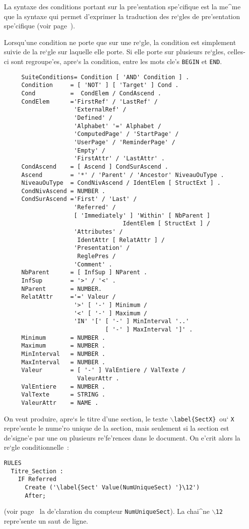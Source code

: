 {La syntaxe des conditions portant sur la pre'sentation spe'cifique est la
me^me que la syntaxe qui permet d'exprimer la traduction des re`gles de
pre'sentation spe'cifique (voir page~\pageref{prestrans}).

Lorsqu'une condition ne porte que sur une re`gle, la condition est simplement
suivie de la re`gle sur laquelle elle porte. Si elle porte sur plusieurs
re`gles, celles-ci sont regroupe'es, apre`s la condition, entre les
mots cle's {\tt BEGIN} et {\tt END}.

\begin{verbatim}
     SuiteConditions= Condition [ 'AND' Condition ] .
     Condition     = [ 'NOT' ] [ 'Target' ] Cond .
     Cond          =  CondElem / CondAscend .
     CondElem      ='FirstRef' / 'LastRef' /
                    'ExternalRef' /
                    'Defined' /
                    'Alphabet' '=' Alphabet /
                    'ComputedPage' / 'StartPage' / 
                    'UserPage' / 'ReminderPage' /
                    'Empty' /
                    'FirstAttr' / 'LastAttr' .
     CondAscend    = [ Ascend ] CondSurAscend .
     Ascend        = '*' / 'Parent' / 'Ancestor' NiveauOuType .
     NiveauOuType  = CondNivAscend / IdentElem [ StructExt ] .
     CondNivAscend = NUMBER .
     CondSurAscend ='First' / 'Last' /
                    'Referred' /
                    [ 'Immediately' ] 'Within' [ NbParent ]
                                  IdentElem [ StructExt ] /
                    'Attributes' /
                     IdentAttr [ RelatAttr ] /
                    'Presentation' /
                     ReglePres /
                    'Comment' .		    
     NbParent      = [ InfSup ] NParent .
     InfSup        = '>' / '<' .
     NParent       = NUMBER.
     RelatAttr     ='=' Valeur /
                    '>' [ '-' ] Minimum /
                    '<' [ '-' ] Maximum /
                    'IN' '[' [ '-' ] MinInterval '..'
                             [ '-' ] MaxInterval ']' .
     Minimum       = NUMBER .
     Maximum       = NUMBER .
     MinInterval   = NUMBER .
     MaxInterval   = NUMBER .
     Valeur        = [ '-' ] ValEntiere / ValTexte /
                     ValeurAttr .
     ValEntiere    = NUMBER .
     ValTexte      = STRING .
     ValeurAttr    = NAME .
\end{verbatim}

\begin{example}
On veut produire, apre`s le titre d'une section, le texte
{\tt $\backslash$label\{SectX\} }ou` {\tt X} repre'sente le nume'ro unique
de la section, mais seulement si la section est de'signe'e par une ou
plusieurs re'fe'rences dans le document. On e'crit alors la re`gle
conditionnelle~:
\begin{verbatim}
RULES
  Titre_Section :
    IF Referred
      Create ('\label{Sect' Value(NumUniqueSect) '}\12')
      After;
\end{verbatim}
(voir page~\pageref{numunique} la de'claration du compteur
{\tt NumUniqueSect}). La chai^ne {\tt $\backslash$12} repre'sente un saut
de ligne.
\end{example}

}
